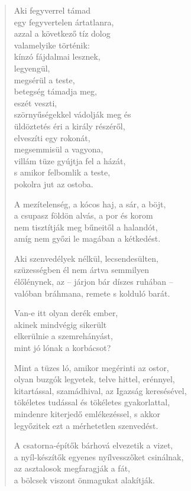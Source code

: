 \begin{verse}
 Aki fegyverrel támad\\
egy fegyvertelen ártatlanra,\\
azzal a következő tíz dolog\\
valamelyike történik:\\
kínzó fájdalmai lesznek,\\
legyengül,\\
megsérül a teste,\\
betegség támadja meg,\\
eszét veszti,\\
szörnyűségekkel vádolják meg és\\
üldöztetés éri a király részéről,\\
elveszíti egy rokonát,\\
megsemmisül a vagyona,\\
villám tüze gyújtja fel a házát,\\
s amikor felbomlik a teste,\\
pokolra jut az ostoba.

 A mezítelenség, a kócos haj, a sár, a böjt,\\
a csupasz földön alvás, a por és korom\\
nem tisztítják meg bűneitől a halandót,\\
amíg nem győzi le magában a kétkedést.

 Aki szenvedélyek nélkül, lecsendesülten,\\
szüzességben él nem ártva semmilyen\\
élőlénynek, az – járjon bár díszes ruhában –\\
valóban bráhmana, remete s kolduló barát.

 Van-e itt olyan derék ember,\\
akinek mindvégig sikerült\\
elkerülnie a szemrehányást,\\
mint jó lónak a korbácsot?

 Mint a tüzes ló, amikor megérinti az ostor,\\
olyan buzgók legyetek, telve hittel, erénnyel,\\
kitartással, szamádhival, az Igazság keresésével,\\
tökéletes tudással és tökéletes gyakorlattal,\\
mindenre kiterjedő emlékezéssel, s akkor\\
legyőzitek ezt a mérhetetlen szenvedést.

 A csatorna-építők bárhová elvezetik a vizet,\\
a nyíl-készítők egyenes nyílvesszőket csinálnak,\\
az asztalosok megfaragják a fát,\\
a bölcsek viszont önmagukat alakítják.

\end{verse}
